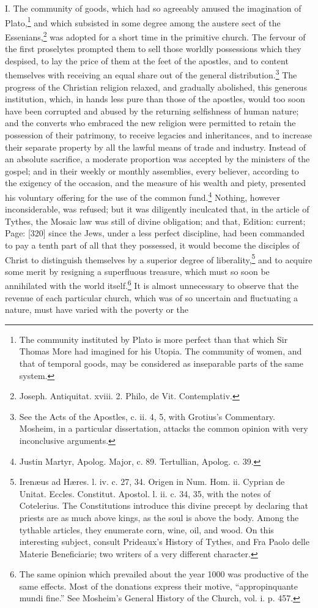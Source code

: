 I. The community of goods, which had so agreeably amused the imagination of Plato,\footnote{The community instituted by Plato is more perfect than that which Sir Thomas More had imagined for his Utopia. The community of women, and that of temporal goods, may be considered as inseparable parts of the same system.} and which subsisted in some degree among the austere sect of the Essenians,\footnote{Joseph. Antiquitat. xviii. 2. Philo, de Vit. Contemplativ.} was adopted for a short time in the primitive church. The fervour of the first proselytes prompted them to sell those worldly possessions which they despised, to lay the price of them at the feet of the apostles, and to content themselves with receiving an equal share out of the general distribution.\footnote{See the Acts of the Apostles, c. ii. 4, 5, with Grotius\texthebrew{}’s Commentary. Mosheim, in a particular dissertation, attacks the common opinion with very inconclusive arguments.} The progress of the Christian religion relaxed, and gradually abolished, this generous institution, which, in hands less pure than those of the apostles, would too soon have been corrupted and abused by the returning selfishness of human nature; and the converts who embraced the new religion were permitted to retain the possession of their patrimony, to receive legacies and inheritances, and to increase their separate property by all the lawful means of trade and industry. Instead of an absolute sacrifice, a moderate proportion was accepted by the ministers of the gospel; and in their weekly or monthly assemblies, every believer, according to the exigency of the occasion, and the measure of his wealth and piety, presented his voluntary offering for the use of the common fund.\footnote{Justin Martyr, Apolog. Major, c. 89. Tertullian, Apolog. c. 39.} Nothing, however inconsiderable, was refused; but it was diligently inculcated that, in the article of Tythes, the Mosaic law was still of divine obligation; and that, Edition: current; Page: [320] since the Jews, under a less perfect discipline, had been commanded to pay a tenth part of all that they possessed, it would become the disciples of Christ to distinguish themselves by a superior degree of liberality,\footnote{Irenæus ad Hæres. l. iv. c. 27, 34. Origen in Num. Hom. ii. Cyprian de Unitat. Eccles. Constitut. Apostol. l. ii. c. 34, 35, with the notes of Cotelerius. The Constitutions introduce this divine precept by declaring that priests are as much above kings, as the soul is above the body. Among the tythable articles, they enumerate corn, wine, oil, and wood. On this interesting subject, consult Prideaux\texthebrew{}’s History of Tythes, and Fra Paolo delle Materie Beneficiarie; two writers of a very different character.} and to acquire some merit by resigning a superfluous treasure, which must so soon be annihilated with the world itself.\footnote{The same opinion which prevailed about the year 1000 was productive of the same effects. Most of the donations express their motive, \texthebrew{“}appropinquante mundi fine.\texthebrew{}” See Mosheim\texthebrew{}’s General History of the Church, vol. i. p. 457.} It is almost unnecessary to observe that the revenue of each particular church, which was of so uncertain and fluctuating a nature, must have varied with the poverty or the 